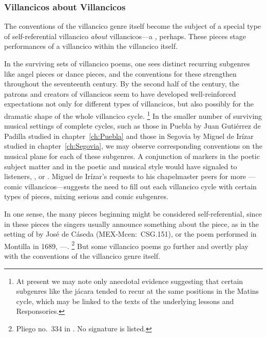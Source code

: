 \subsubsection{Villancicos about Villancicos}

The conventions of the villancico genre itself become the subject of a special type of self-referential villancico \emph{about} villancicos---a , perhaps.
These pieces stage performances of a villancico within the villancico itself.

In the surviving sets of villancico poems, one sees distinct recurring subgenres like angel pieces or dance pieces, and the conventions for these strengthen throughout the seventeenth century.
By the second half of the century, the patrons and creators of villancicos seem to have developed well-reinforced expectations not only for different types of villancicos, but also possibly for the dramatic shape of the whole villancico cycle.%
	\footnote{%
	At present we may note only anecdotal evidence suggesting that certain subgenres like the jácara tended to recur at the same positions in the Matins cycle, which may be linked to the texts of the underlying lessons and Responsories.
	}
In the smaller number of surviving musical settings of complete cycles, such as those in Puebla by Juan Gutiérrez de Padilla studied in chapter~\ref{ch:Puebla} and those in Segovia by Miguel de Irízar studied in chapter~\ref{ch:Segovia}, we may observe corresponding conventions on the musical plane for each of these subgenres.
A conjunction of markers in the poetic subject matter and in the poetic and musical style would have signaled to listeners, , or .
Miguel de Irízar's requests to his chapelmaster peers for more ---comic villancicos---suggests the need to fill out each villancico cycle with certain types of pieces, mixing serious and comic subgenres.%
	\autocite[78]{Olarte:Irizar}

In one sense, the many pieces beginning   might be considered self-referential, since in these pieces the singers usually announce something about the piece, as in the setting of  by José de Cáseda (MEX-Mcen:~CSG.151), or the poem performed in Montilla in 1689, ---.%
	\footnote{%
	Pliego no.~334 in \autocite[116]{BNE:VCs17C}.
	No signature is listed.
	}
But some villancico poems go further and overtly play with the conventions of the villancico genre itself.

